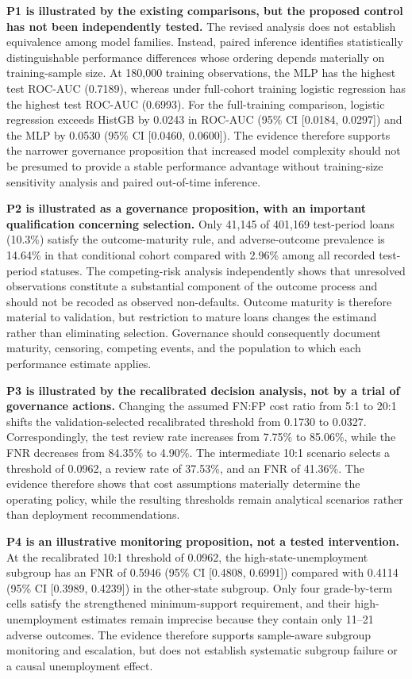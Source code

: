 \documentclass[10pt]{article}
\begin{document}
\textbf{P1 is illustrated by the existing comparisons, but the proposed control has not been independently tested.} The revised analysis does not establish equivalence among model families. Instead, paired inference identifies statistically distinguishable performance differences whose ordering depends materially on training-sample size. At 180,000 training observations, the MLP has the highest test ROC-AUC (0.7189), whereas under full-cohort training logistic regression has the highest test ROC-AUC (0.6993). For the full-training comparison, logistic regression exceeds HistGB by 0.0243 in ROC-AUC (95\% CI [0.0184, 0.0297]) and the MLP by 0.0530 (95\% CI [0.0460, 0.0600]). The evidence therefore supports the narrower governance proposition that increased model complexity should not be presumed to provide a stable performance advantage without training-size sensitivity analysis and paired out-of-time inference.

\textbf{P2 is illustrated as a governance proposition, with an important qualification concerning selection.} Only 41,145 of 401,169 test-period loans (10.3\%) satisfy the outcome-maturity rule, and adverse-outcome prevalence is 14.64\% in that conditional cohort compared with 2.96\% among all recorded test-period statuses. The competing-risk analysis independently shows that unresolved observations constitute a substantial component of the outcome process and should not be recoded as observed non-defaults. Outcome maturity is therefore material to validation, but restriction to mature loans changes the estimand rather than eliminating selection. Governance should consequently document maturity, censoring, competing events, and the population to which each performance estimate applies.

\textbf{P3 is illustrated by the recalibrated decision analysis, not by a trial of governance actions.} Changing the assumed FN:FP cost ratio from 5:1 to 20:1 shifts the validation-selected recalibrated threshold from 0.1730 to 0.0327. Correspondingly, the test review rate increases from 7.75\% to 85.06\%, while the FNR decreases from 84.35\% to 4.90\%. The intermediate 10:1 scenario selects a threshold of 0.0962, a review rate of 37.53\%, and an FNR of 41.36\%. The evidence therefore shows that cost assumptions materially determine the operating policy, while the resulting thresholds remain analytical scenarios rather than deployment recommendations.

\textbf{P4 is an illustrative monitoring proposition, not a tested intervention.} At the recalibrated 10:1 threshold of 0.0962, the high-state-unemployment subgroup has an FNR of 0.5946 (95\% CI [0.4808, 0.6991]) compared with 0.4114 (95\% CI [0.3989, 0.4239]) in the other-state subgroup. Only four grade-by-term cells satisfy the strengthened minimum-support requirement, and their high-unemployment estimates remain imprecise because they contain only 11--21 adverse outcomes. The evidence therefore supports sample-aware subgroup monitoring and escalation, but does not establish systematic subgroup failure or a causal unemployment effect.
\end{document}
